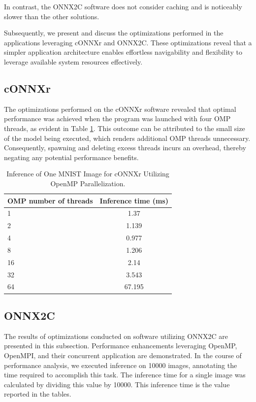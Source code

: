 \documentclass[fleqn,10pt]{olplainarticle}
\begin{document}
In contrast, the ONNX2C software does not consider caching and is noticeably slower than the other solutions.

Subsequently, we present and discuss the optimizations performed in the applications leveraging cONNXr and ONNX2C. These optimizations reveal that a simpler application architecture enables effortless navigability and flexibility to leverage available system resources effectively.

\subsection{cONNXr}
The optimizations performed on the cONNXr software revealed that optimal performance was achieved when the program was launched with four OMP threads, as evident in Table \ref{tab:connxr_omp}. This outcome can be attributed to the small size of the model being executed, which renders additional OMP threads unnecessary. Consequently, spawning and deleting excess threads incurs an overhead, thereby negating any potential performance benefits.

\begin{table}[!ht]
    \centering
    \begin{tabular}{|l|c|}
    \hline
    \textbf{OMP number of threads} & \textbf{Inference time (ms)} \\ \hline
    1                              & 1.37                         \\ \hline
    2                              & 1.139                        \\ \hline
    4                              & 0.977                        \\ \hline
    8                              & 1.206                        \\ \hline
    16                             & 2.14                         \\ \hline
    32                             & 3.543                        \\ \hline
    64                             & 67.195                       \\ \hline
    \end{tabular}
    \caption{Inference of One MNIST Image for cONNXr Utilizing OpenMP Parallelization.}
    \label{tab:connxr_omp}
\end{table}

\subsection{ONNX2C}
The results of optimizations conducted on software utilizing ONNX2C are presented in this subsection. Performance enhancements leveraging OpenMP, OpenMPI, and their concurrent application are demonstrated. In the course of performance analysis, we executed inference on 10000 images, annotating the time required to accomplish this task. The inference time for a single image was calculated by dividing this value by 10000. This inference time is the value reported in the tables.
\end{document}
